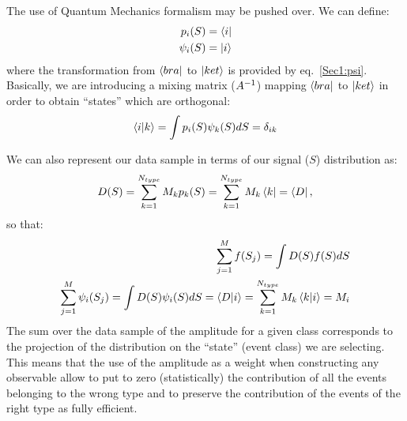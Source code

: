 The use of Quantum Mechanics formalism may be pushed over.
We can define:
\begin{eqnarray}
\label{Sec1:QMdef1}
p_{i}(S) = \bra{i} \\
\psi_{i}(S) = \ket{i}
\end{eqnarray}
where the transformation from $\bra{bra}$ to $\ket{ket}$ is provided by eq.~\ref{Sec1:psi}.
Basically, we are introducing a mixing matrix ($\boldmath{A^{-1}}$) mapping $\bra{bra}$
to $\ket{ket}$ in order to obtain ``states'' which are orthogonal:
\begin{equation}
\label{Sec1:Orto}
\braket{i|k} = \int p_{i}(S) \psi_{k}(S) dS = \delta_{ik}
\end{equation}

We can also represent our data sample in terms of our signal ($S$)
distribution as:
\begin{equation}
\label{Sec1:DataSample}
D(S) = \sum\limits_{k=1}^{N_{type}} M_{k} p_{k}(S) = 
\sum\limits_{k=1}^{N_{type}}M_{k}\bra{k} = \bra{D},
\end{equation}
so that:
\begin{eqnarray}
\label{Sec1:Distribution}
\sum\limits_{j=1}^{M} f(S_j) = \int D(S) f(S) dS \\
\sum\limits_{j=1}^{M} \psi_{i}(S_j) = \int D(S) \psi_{i}(S) dS = \braket{D|i} = \sum\limits_{k=1}^{N_{type}}M_{k}\braket{k|i}=M_{i}
\end{eqnarray}
The sum over the data sample of the amplitude for a given class corresponds to
the projection of the distribution on the ``state'' (event class) we are
selecting. This means that the use of the amplitude as a weight when
constructing any observable allow to put to zero (statistically) the contribution of all the
events belonging to the wrong type and to preserve the contribution of the
events of the right type as fully efficient.
